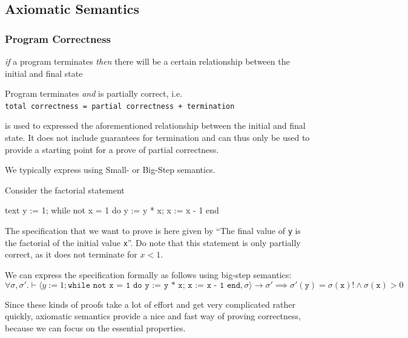 \newpage
\subsection{Axiomatic Semantics}
\subsubsection{Program Correctness}
 \textit{if} a program terminates \textit{then} there will be a certain relationship between the initial and final state

 Program terminates \textit{and} is partially correct, i.e.\\
\texttt{total correctness = partial correctness + termination}

 is used to expressed the aforementioned relationship between the initial and final state.
It does not include guarantees for termination and can thus only be used to provide a starting point for a prove of partial correctness.

We typically express  using Small- or Big-Step semantics.

\inlineexample Consider the factorial statement
\begin{code}{text}
    y := 1;
    while not x = 1 do
        y := y * x;
        x := x - 1
    end
\end{code}
The specification that we want to prove is here given by ``The final value of \texttt{y} is the factorial of the initial value \texttt{x}''.
Do note that this statement is only partially correct, as it does not terminate for $x < 1$.

We can express the specification formally as follows using big-step semantics:
\[
    \forall \sigma, \sigma'. \vdash \langle y := 1; \texttt{while not x = 1 do y := y * x; x := x - 1 end}, \sigma \rangle \rightarrow \sigma' 
    \implies \sigma'(\texttt{y}) = \sigma(\texttt{x})! \land \sigma(\texttt{x}) > 0
\]

%
%
Since these kinds of proofs take a lot of effort and get very complicated rather quickly, axiomatic semantics provide a nice and fast way of proving correctness,
because we can focus on the essential properties.
